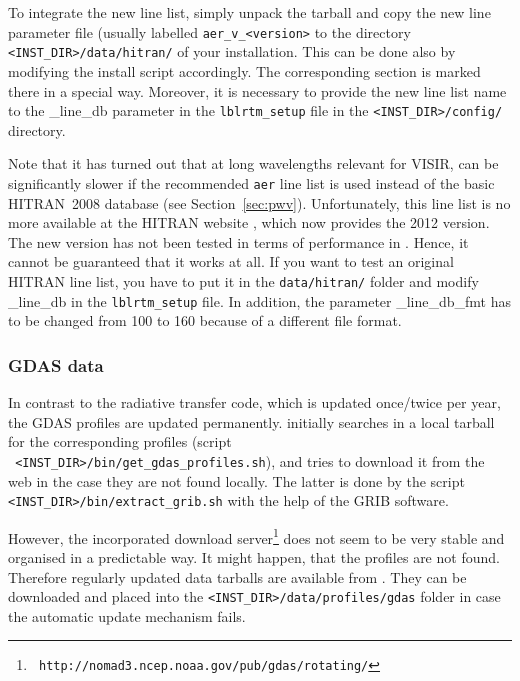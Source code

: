 To integrate the new line list, simply unpack the tarball and copy the new line
parameter file (usually labelled {\tt aer\_v\_<version>} to the directory {\tt
<INST\_DIR>/data/hitran/} of your \mf{} installation. This can be
done also by modifying the install script accordingly. The corresponding
section is marked there in a special way. Moreover, it is necessary to provide
the new line list name to the {\sc \_line\_db} parameter in the
{\tt lblrtm\_setup} file in the {\tt<INST\_DIR>/config/} directory.

Note that it has turned out that at long wavelengths relevant for VISIR, \mf{}
can be significantly slower if the recommended {\tt aer} line list is used
instead of the basic HITRAN~2008 database (see Section~\ref{sec:pwv}).
Unfortunately, this line list is no more available at the HITRAN website
\cite{HITRAN}, which now provides the 2012 version. The new version has not
been tested in terms of performance in \mf{}. Hence, it cannot be guaranteed
that it works at all. If you want to test an original HITRAN line list, you
have to put it in the {\tt data/hitran/} folder and modify {\sc \_line\_db} in
the {\tt lblrtm\_setup} file. In addition, the parameter {\sc \_line\_db\_fmt}
has to be changed from 100 to 160 because of a different file format.

\subsubsection{GDAS data}\label{app:gdas}
In contrast to the radiative transfer code, which is updated once/twice per
year, the GDAS profiles are updated permanently. \mf{} initially searches in a
local tarball for the corresponding profiles (script \\{\tt
<INST\_DIR>/bin/get\_gdas\_profiles.sh}), and tries to download it
from the web in the case they are not found locally. The latter is done by the
script {\tt <INST\_DIR>/bin/extract\_grib.sh} with the help of the
GRIB software.

However, the incorporated download server\footnote{\tt
http://nomad3.ncep.noaa.gov/pub/gdas/rotating/} does not seem to be very stable
and organised in a predictable way. It might happen, that the profiles are
not found.
Therefore regularly updated data tarballs are available from \molecpage.
They can be downloaded and placed into the {\tt <INST\_DIR>/data/profiles/gdas}
folder in case the automatic update mechanism fails.

